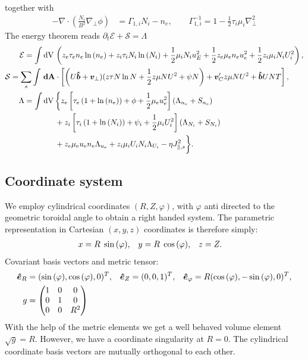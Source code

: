 together with
  \begin{align}
    -\nabla\cdot\left( \frac{N_i}{B^2}\nabla_\perp \phi \right) &= \Gamma_{1,i} N_i - n_e, \quad\quad
    \Gamma_{1,i}^{-1} = 1-\frac{1}{2}\tau_i\mu_i \nabla_\perp^2
  \end{align}
The energy theorem reads $\partial_t \mathcal E + \mathcal S = \Lambda$
\begin{align}
  \mathcal{E}= \int  \mathrm{dV}\, & \left( z_e\tau_e n_e \ln{(n_e)} +z_i\tau_i N_i\ln{(N_i)}+  \frac{1}{2} \mu_i N_i u_E^2 +\frac{1}{2} z_e\mu_e  n_e u_e^2 +\frac{1}{2} z_i\mu_i  N_i U_i^2  \right),\\
  \mathcal S = \sum_s \int {\boldsymbol{\,\mathrm{dA}}} & \cdot\left[ \left( U\bm{\hat{b}} + {\boldsymbol{v}}_\perp )
  (z\tau N\ln N + \frac{1}{2}z\mu NU^2 + \psi N \right) + {\boldsymbol{v}}_C' z\mu NU^2 + \bm{\hat{b}} UNT \right], \\
  \Lambda =  \int \mathrm{dV}\, & \bigg\{  z_e\left[\tau_e\left( 1+\ln{(n_e)}\right) + \phi + \frac{1}{2} \mu_e u_e^2 \right](\Lambda_{n_e} + S_{n_e})
  \nonumber\\ &
+z_i\left[\tau_i\left( 1+\ln{(N_i)}\right) + \psi_i + \frac{1}{2} \mu_i U_i^2 \right](\Lambda_{N_i}+S_{N_i})
\nonumber \\ &
+ z_e\mu_e u_e n_e \Lambda_{u_e}+z_i\mu_iU_i N_i \Lambda_{U_i} - \eta J_{\parallel,s}^2\bigg\}.
\end{align}

\subsection{Coordinate system}\label{sec:cylmetric}
We employ cylindrical coordinates \( (R,Z,\varphi) \), with \(\varphi\) anti directed to the geometric toroidal angle to
obtain a right handed system. The parametric representation in Cartesian \((x,y,z)\) coordinates is therefore simply:
\begin{align}
 x &= R \hspace{1 mm} \sin{(\varphi)}, &
 y &= R \hspace{1 mm} \cos{(\varphi)}, &
 z &= Z .
\end{align}
Covariant
basis vectors and metric tensor:
\begin{align}
 \bm{\hat{e}}_R      &= (\sin{(\varphi)} ,   \cos{(\varphi)},0)^T, &
 \bm{\hat{e}}_Z      &= ( 0 ,0 ,1 )^T, &
 \bm{\hat{e}}_{\varphi} &= R ( \cos{(\varphi)} , -\sin{(\varphi)} , 0 )^T,
\\
 g &= \begin{pmatrix}
  1 & 0 & 0 \\
  0 & 1 & 0 \\
  0 & 0 & R^2
   \end{pmatrix}
\end{align}
With the help of the metric elements we get a well behaved volume element \(\sqrt{g} = R\). However, we have a coordinate singularity at \(R=0\).
The cylindrical coordinate basis vectors are mutually orthogonal to each other.
